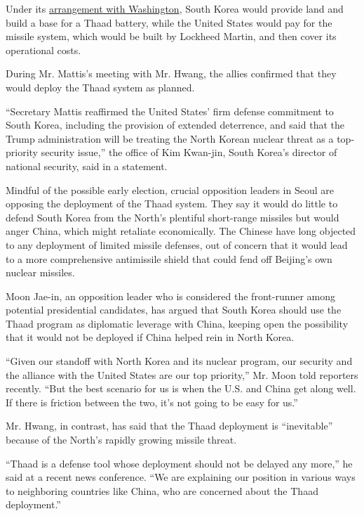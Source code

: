 Under its
\href{https://www.nytimes3xbfgragh.onion/2016/07/14/world/asia/south-korea-thaad-us.html}{arrangement
with Washington}, South Korea would provide land and build a base for a
Thaad battery, while the United States would pay for the missile system,
which would be built by Lockheed Martin, and then cover its operational
costs.

During Mr. Mattis's meeting with Mr. Hwang, the allies confirmed that
they would deploy the Thaad system as planned.

``Secretary Mattis reaffirmed the United States' firm defense commitment
to South Korea, including the provision of extended deterrence, and said
that the Trump administration will be treating the North Korean nuclear
threat as a top-priority security issue,'' the office of Kim Kwan-jin,
South Korea's director of national security, said in a statement.

Mindful of the possible early election, crucial opposition leaders in
Seoul are opposing the deployment of the Thaad system. They say it would
do little to defend South Korea from the North's plentiful short-range
missiles but would anger China, which might retaliate economically. The
Chinese have long objected to any deployment of limited missile
defenses, out of concern that it would lead to a more comprehensive
antimissile shield that could fend off Beijing's own nuclear missiles.

Moon Jae-in, an opposition leader who is considered the front-runner
among potential presidential candidates, has argued that South Korea
should use the Thaad program as diplomatic leverage with China, keeping
open the possibility that it would not be deployed if China helped rein
in North Korea.

``Given our standoff with North Korea and its nuclear program, our
security and the alliance with the United States are our top priority,''
Mr. Moon told reporters recently. ``But the best scenario for us is when
the U.S. and China get along well. If there is friction between the two,
it's not going to be easy for us.''

Mr. Hwang, in contrast, has said that the Thaad deployment is
``inevitable'' because of the North's rapidly growing missile threat.

``Thaad is a defense tool whose deployment should not be delayed any
more,'' he said at a recent news conference. ``We are explaining our
position in various ways to neighboring countries like China, who are
concerned about the Thaad deployment.''

